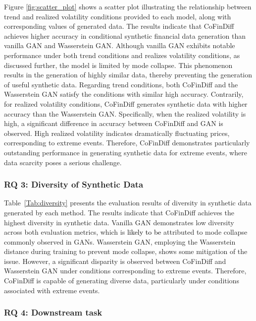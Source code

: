 \documentclass{article}
\newcommand{\takehiro}[1]{\textcolor{black}{#1}}
\begin{document}
Figure \ref{fig:scatter_plot} shows a scatter plot illustrating the relationship between trend and realized volatility conditions provided to each model, along with corresponding values of generated data.
The results indicate that CoFinDiff achieves higher accuracy in conditional synthetic financial data generation than vanilla GAN and Wasserstein GAN.
Although vanilla GAN exhibits notable performance under both trend conditions and realizes volatility conditions, as discussed further, the model is limited by mode collapse.
This phenomenon results in the generation of highly similar data, thereby preventing the generation of useful synthetic data.
Regarding trend conditions, both CoFinDiff and the Wasserstein GAN satisfy the conditions with similar high accuracy.
Contrarily, for realized volatility conditions, CoFinDiff generates synthetic data with higher accuracy than the Wasserstein GAN.
Specifically, when the realized volatility is high, a significant difference in accuracy between CoFinDiff and GAN is observed. 
High realized volatility indicates dramatically fluctuating prices, corresponding to extreme events. Therefore, CoFinDiff demonstrates particularly outstanding performance in generating synthetic data for extreme events, where data scarcity poses a serious challenge.

\subsubsection{RQ 3: Diversity of Synthetic Data}

Table~\ref{Tab:diversity} presents the evaluation results of diversity in synthetic data generated by each method.
The results indicate that CoFinDiff achieves the highest diversity in synthetic data. Vanilla GAN demonstrates low diversity across both evaluation metrics, which is \takehiro{likely to be} attributed to mode collapse commonly observed in GANs.
Wasserstein GAN, employing the Wasserstein distance during training to prevent mode collapse, shows some mitigation of the issue.
However, a significant disparity is observed between CoFinDiff and Wasserstein GAN under conditions corresponding to extreme events.
Therefore, CoFinDiff is capable of generating diverse data, particularly under conditions associated with extreme events.

\subsubsection{RQ 4: Downstream task}
\end{document}
